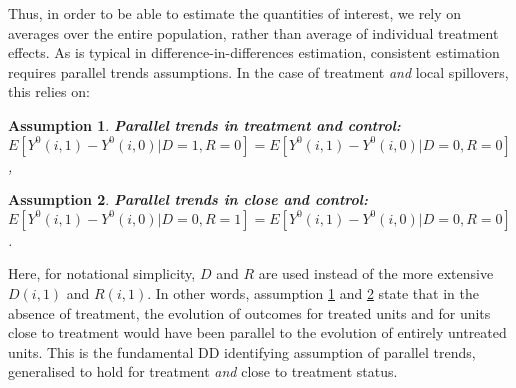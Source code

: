 \documentclass{article}
\newtheorem{assumption}{Assumption}
\begin{document}
\begin{spacing}{1.1}
Thus, in order to be able to estimate the quantities of interest, we rely on
averages over the entire population, rather than average of individual 
treatment effects.  As is typical in difference-in-differences estimation,
consistent estimation requires parallel trends assumptions.  In the case of
treatment \emph{and} local spillovers, this relies on:

\begin{assumption}
\label{Sass:PT}
\textbf{Parallel trends in treatment and control:} \\
$E[Y^0(i,1)-Y^0(i,0)|D=1,R=0]=E[Y^0(i,1)-Y^0(i,0)|D=0,R=0]$,
\end{assumption}
\begin{assumption}
\label{Sass:PTC}
\textbf{Parallel trends in close and control:} \\
$E[Y^0(i,1)-Y^0(i,0)|D=0,R=1]=E[Y^0(i,1)-Y^0(i,0)|D=0,R=0]$.
\end{assumption}

Here, for notational simplicity, $D$ and $R$ are used instead of the more 
extensive $D(i,1)$ and $R(i,1)$.  In other words, assumption \ref{Sass:PT}
and \ref{Sass:PTC} state that in the absence of treatment, the evolution
of outcomes for treated units and for units close to treatment would have
been parallel to the evolution of entirely untreated units.  This is the
fundamental DD identifying assumption of parallel trends, generalised to
hold for treatment \emph{and} close to treatment status.


\end{spacing}
\end{document}
